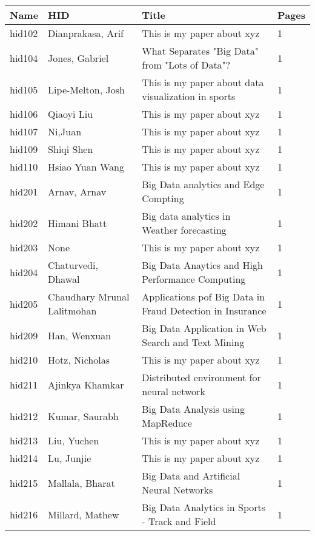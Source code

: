 \documentclass[12pt]{article}
\begin{document}
\begin{footnotesize}
\begin{longtable}{|p{1cm}p{5cm}p{9cm}p{1cm}|}
\hline \textbf{Name} & \textbf{HID} & \textbf{Title} & \textbf{Pages}\\ \hline \hline

hid102 & Dianprakasa, Arif & This is my paper about xyz & 1 \\
\hline
hid104 & Jones, Gabriel & What Separates "Big Data" from "Lots of Data"? & 1 \\
\hline
hid105 & Lipe-Melton, Josh & This is my paper about data visualization in sports & 1 \\
\hline
hid106 & Qiaoyi Liu & This is my paper about xyz & 1 \\
\hline
hid107 & Ni,Juan & This is my paper about xyz & 1 \\
\hline
hid109 & Shiqi Shen & This is my paper about xyz & 1 \\
\hline
hid110 & Hsiao Yuan Wang & This is my paper about xyz & 1 \\
\hline
hid201 & Arnav, Arnav & Big Data analytics and Edge Compting & 1 \\
\hline
hid202 & Himani Bhatt & Big data analytics in Weather forecasting & 1 \\
\hline
hid203 & None & This is my paper about xyz & 1 \\
\hline
hid204 & Chaturvedi, Dhawal & Big Data Anaytics and High Performance Computing & 1 \\
\hline
hid205 & Chaudhary Mrunal Lalitmohan & Applications pof Big Data in Fraud Detection in Insurance & 1 \\
\hline
hid209 & Han, Wenxuan & Big Data Application in Web Search and Text Mining & 1 \\
\hline
hid210 & Hotz, Nicholas & This is my paper about xyz & 1 \\
\hline
hid211 & Ajinkya Khamkar & Distributed environment for neural network & 1 \\
\hline
hid212 & Kumar, Saurabh & Big Data Analysis using MapReduce & 1 \\
\hline
hid213 & Liu, Yuchen & This is my paper about xyz & 1 \\
\hline
hid214 & Lu, Junjie & This is my paper about xyz & 1 \\
\hline
hid215 & Mallala, Bharat & Big Data and Artificial Neural Networks & 1 \\
\hline
hid216 & Millard, Mathew & Big Data Analytics in Sports - Track and Field & 1 \\

\end{longtable}
\end{footnotesize}
\end{document}
